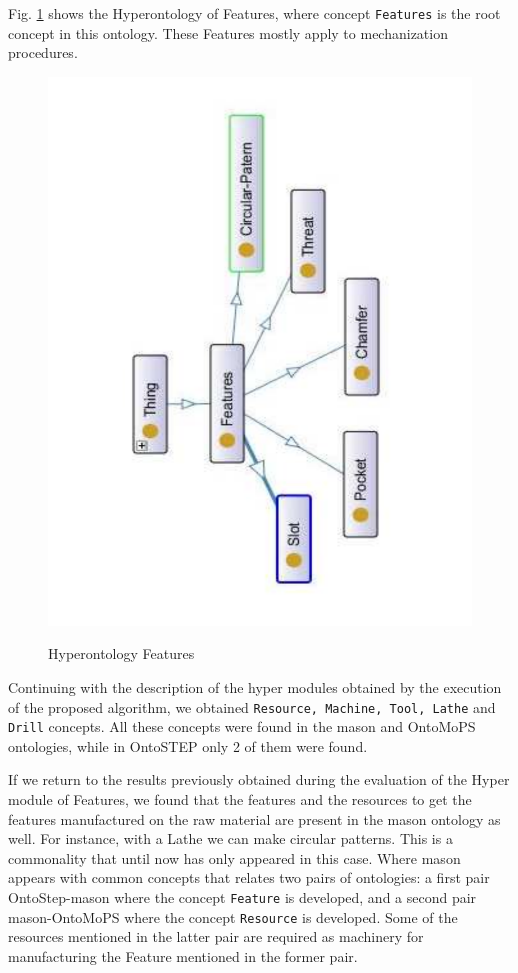 Fig. \ref{figure4-23} shows the Hyperontology of Features, where concept \texttt{Features} is the  root concept in this ontology. These Features mostly apply to mechanization procedures. 


\begin{figure}
\begin{center}
	\includegraphics[scale=0.5, angle=270]{figure-chapterIV/fig4-23}\\
	\caption{Hyperontology Features}
	\label{figure4-23}
\end{center}
\end{figure}

Continuing with the description of the hyper modules obtained by the execution of the proposed algorithm, we obtained \texttt{Resource, Machine, Tool, Lathe} and \texttt{Drill} concepts. All these concepts were  found in the \gls{mason} and OntoMoPS ontologies, while in OntoSTEP only 2 of them were found. 

If we return to the results previously obtained during the evaluation of the Hyper module of Features, we found that the features and the resources to get the features manufactured on the raw material are present in the \gls{mason} ontology as well. For instance, with a Lathe we can make circular patterns. This is a commonality that until now has only appeared in this case. Where \gls{mason} appears with common concepts that relates two pairs of ontologies: a first pair OntoStep-\gls{mason} where the concept \texttt{Feature} is developed, and a second pair \gls{mason}-OntoMoPS where the concept \texttt{Resource} is developed. Some of the resources mentioned in the latter pair are required as machinery for manufacturing the Feature mentioned in the former pair. 

